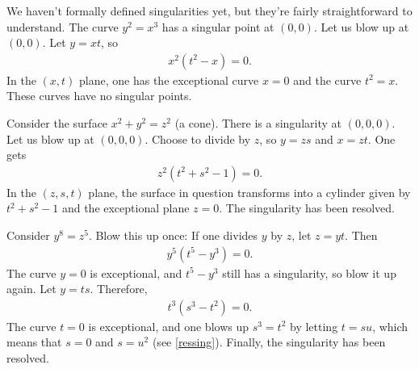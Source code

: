 \documentclass [11 pt, oneside, margin = 1 in] {article}
\begin{document}
\begin{example}\label{ressing}\text{}
We haven't formally defined singularities yet, but they're fairly straightforward to understand. The curve $y^2=x^3$ has a singular point at $(0,0)$. Let us blow up at $(0,0)$. Let $y=xt$, so 
\begin{align*}
	x^2(t^2-x)=0.
\end{align*}
In the $(x,t)$ plane, one has the exceptional curve $x=0$ and the curve $t^2=x$. These curves have no singular points.
\end{example}

\begin{example}[ ]\label{}\text{}
Consider the surface $x^2+y^2=z^2$ (a cone). There is a singularity at $(0,0,0)$. Let us blow up at $(0,0,0)$. Choose to divide by $z$, so $y=zs$ and $x=zt$. One gets
\begin{align*}
	z^2(t^2+s^2-1)=0.
\end{align*}
In the $(z,s,t)$ plane, the surface in question transforms into a cylinder given by $t^2+s^2-1$ and the exceptional plane $z=0$. The singularity has been resolved.
\end{example}

\begin{example}[ ]\label{}\text{}
Consider $y^8=z^5$. Blow this up once: If one divides $y$ by $z$, let $z=yt$. Then
\begin{align*}
	y^5(t^5-y^3)=0.
\end{align*}
The curve $y=0$ is exceptional, and $t^5-y^3$ still has a singularity, so blow it up again. Let $y= ts$. Therefore,
\begin{align*}
	t^3(s^3-t^2)=0.
\end{align*}
The curve $t=0$ is exceptional, and one blows up $s^3=t^2 $ by letting $t=su$, which means that $s=0$ and $s=u^2$ (see \cref{ressing}). Finally, the singularity has been resolved. 
\end{example}
\end{document}
